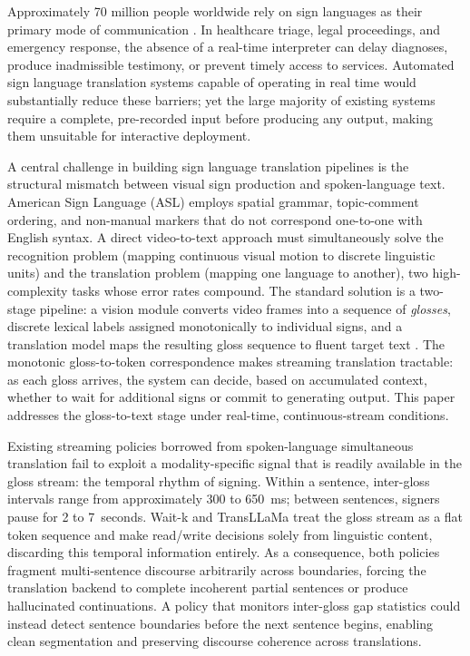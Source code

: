 \documentclass[conference]{IEEEtran}
\begin{document}
Approximately 70 million people worldwide rely on sign languages as their primary mode of communication \cite{who2021}. In healthcare triage, legal proceedings, and emergency response, the absence of a real-time interpreter can delay diagnoses, produce inadmissible testimony, or prevent timely access to services. Automated sign language translation systems capable of operating in real time would substantially reduce these barriers; yet the large majority of existing systems require a complete, pre-recorded input before producing any output, making them unsuitable for interactive deployment.

A central challenge in building sign language translation pipelines is the structural mismatch between visual sign production and spoken-language text. American Sign Language (ASL) employs spatial grammar, topic-comment ordering, and non-manual markers that do not correspond one-to-one with English syntax. A direct video-to-text approach must simultaneously solve the recognition problem (mapping continuous visual motion to discrete linguistic units) and the translation problem (mapping one language to another), two high-complexity tasks whose error rates compound. The standard solution is a two-stage pipeline: a vision module converts video frames into a sequence of \emph{glosses}, discrete lexical labels assigned monotonically to individual signs, and a translation model maps the resulting gloss sequence to fluent target text \cite{koller2015continuous,camgoz2018neural}. The monotonic gloss-to-token correspondence makes streaming translation tractable: as each gloss arrives, the system can decide, based on accumulated context, whether to wait for additional signs or commit to generating output. This paper addresses the gloss-to-text stage under real-time, continuous-stream conditions.

Existing streaming policies borrowed from spoken-language simultaneous translation fail to exploit a modality-specific signal that is readily available in the gloss stream: the temporal rhythm of signing. Within a sentence, inter-gloss intervals range from approximately 300 to 650~ms; between sentences, signers pause for 2 to 7~seconds. Wait-k \cite{ma2019stacl} and TransLLaMa \cite{koshkin2024transllama} treat the gloss stream as a flat token sequence and make read/write decisions solely from linguistic content, discarding this temporal information entirely. As a consequence, both policies fragment multi-sentence discourse arbitrarily across boundaries, forcing the translation backend to complete incoherent partial sentences or produce hallucinated continuations. A policy that monitors inter-gloss gap statistics could instead detect sentence boundaries before the next sentence begins, enabling clean segmentation and preserving discourse coherence across translations.
\end{document}
